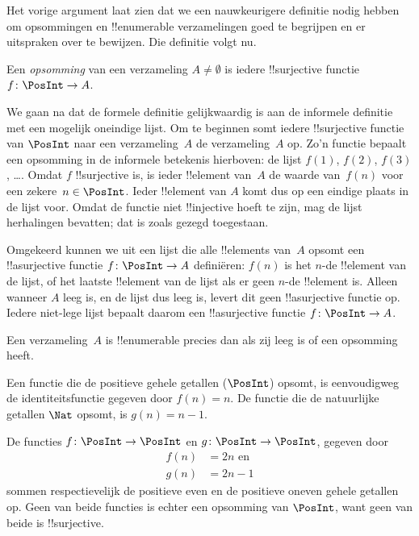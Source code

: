 \documentclass[openany]{memoir}
\begin{document}
Het vorige argument laat zien dat we een nauwkeurigere definitie nodig
hebben om opsommingen en !!{enumerable} verzamelingen goed te begrijpen
en er uitspraken over te bewijzen. Die definitie volgt nu.

\begin{defn} 
Een \emph{opsomming} van een verzameling $A \neq \emptyset$ is iedere
!!{surjective} functie $f \colon \PosInt \to A$.
\end{defn}

\begin{explain}
We gaan na dat de formele definitie gelijkwaardig is aan de informele
definitie met een mogelijk oneindige lijst. Om te beginnen somt iedere
!!{surjective} functie van $\PosInt$ naar een verzameling~$A$ de
verzameling~$A$ op. Zo'n functie bepaalt een opsomming in de informele
betekenis hierboven: de lijst $f(1)$, $f(2)$, $f(3)$, \dots. Omdat $f$
!!{surjective} is, is ieder !!{element} van~$A$ de waarde van~$f(n)$
voor een zekere~$n \in \PosInt$. Ieder !!{element} van $A$ komt dus op
een eindige plaats in de lijst voor. Omdat de functie niet
!!{injective} hoeft te zijn, mag de lijst herhalingen bevatten; dat is
zoals gezegd toegestaan.

Omgekeerd kunnen we uit een lijst die alle !!{element}s van~$A$ opsomt
een !!a{surjective} functie $f\colon \PosInt \to A$ definiëren: $f(n)$
is het $n$-de !!{element} van de lijst, of het laatste !!{element} van
de lijst als er geen $n$-de !!{element} is. Alleen wanneer $A$ leeg is,
en de lijst dus leeg is, levert dit geen !!a{surjective} functie op.
Iedere niet-lege lijst bepaalt daarom een !!a{surjective} functie
$f\colon \PosInt \to A$.
\end{explain}

\begin{defn}
  Een verzameling~$A$ is !!{enumerable} precies dan als zij leeg is of
  een opsomming heeft.
\end{defn}

\begin{ex}
Een functie die de positieve gehele getallen ($\PosInt$) opsomt, is
eenvoudigweg de identiteitsfunctie gegeven door $f(n) = n$. De functie
die de natuurlijke getallen $\Nat$ opsomt, is $g(n) = n - 1$.
\end{ex}

\begin{ex}
De functies $f\colon \PosInt \to \PosInt$ en $g \colon \PosInt \to
\PosInt$, gegeven door
\begin{align*}
f(n) & = 2n \text{ en}\\
g(n) & = 2n - 1
\end{align*}
sommen respectievelijk de positieve even en de positieve oneven gehele
getallen op. Geen van beide functies is echter een opsomming van
$\PosInt$, want geen van beide is !!{surjective}.
\end{ex}
\end{document}
